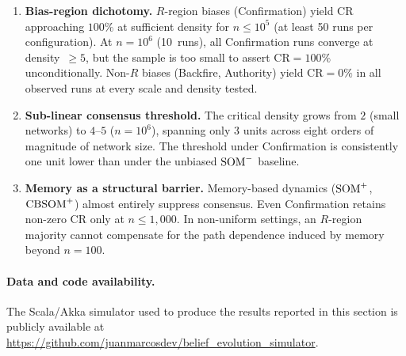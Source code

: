 \begin{enumerate}
  \item \textbf{Bias-region dichotomy.}
    $R$-region biases (Confirmation) yield $\mathrm{CR}$ approaching
    $100\%$ at sufficient density for $n\le 10^5$ (at least 50 runs per
    configuration). At $n=10^6$ (10~runs), all Confirmation runs converge
    at density~$\ge 5$, but the sample is too small to assert
    $\mathrm{CR}=100\%$ unconditionally.
    Non-$R$ biases (Backfire, Authority) yield $\mathrm{CR}=0\%$
    in all observed runs at every scale and density tested.

  \item \textbf{Sub-linear consensus threshold.}
    The critical density grows from $2$ (small networks) to $4$--$5$
    ($n=10^6$), spanning only $3$ units across eight orders of
    magnitude of network size. The threshold under Confirmation is
    consistently one unit lower than under the unbiased $\mathrm{SOM}^{-}$
    baseline.

  \item \textbf{Memory as a structural barrier.}
    Memory-based dynamics ($\mathrm{SOM}^{+}$, $\mathrm{CBSOM}^{+}$) almost entirely
    suppress consensus. Even Confirmation retains non-zero
    $\mathrm{CR}$ only at $n \le 1{,}000$. In non-uniform
    settings, an $R$-region majority cannot compensate for the path
    dependence induced by memory beyond $n=100$.
\end{enumerate}

\paragraph{Data and code availability.}
The Scala/Akka simulator used to produce the results reported in this
section is publicly available at
\url{https://github.com/juanmarcosdev/belief_evolution_simulator}.
